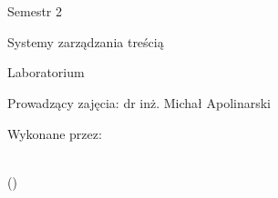 \pagestyle{empty}


\begin{center}
\Huge{{{\fontsize{24}{30} \textbf{\sffamily{\Title}}\\}}}
\LARGE{{{\fontsize{16}{24} \textbf{\sffamily{\Subtitle}}\\}}}
\vfill
Semestr 2

Systemy zarządzania treścią

Laboratorium

Prowadzący zajęcia: dr inż. Michał Apolinarski
\vfill

\large
Wykonane przez:\\
\fontsize{15pt}{15pt}\selectfont
\textbf{\sffamily{\Author}} \\
\fontsize{11pt}{15pt}\selectfont
\vspace{0.6cm}

\vspace{0.6cm}

\normalsize{\Date\space(\Version)}

\end{center}

\restoregeometry
